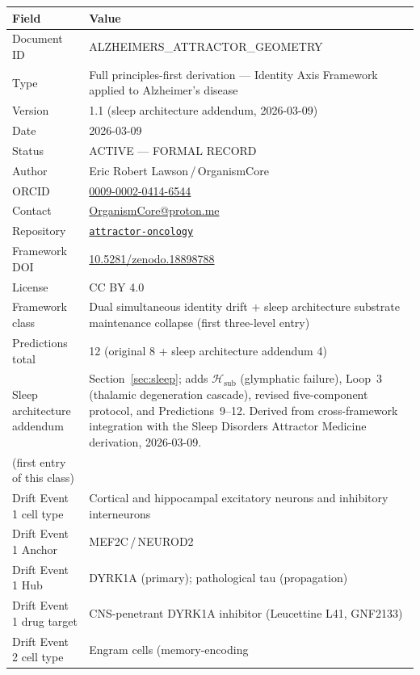 \documentclass[12pt,a4paper]{article}
\begin{document}
\begin{center}
\begin{tabular}{p{4.4cm}p{9.0cm}}
\toprule
\textbf{Field} & \textbf{Value} \\
\midrule
Document ID &
ALZHEIMERS\_ATTRACTOR\_GEOMETRY \\
Type &
Full principles-first derivation ---
Identity Axis Framework applied to
Alzheimer's disease \\
Version & 1.1 (sleep architecture addendum,
  2026-03-09) \\
Date & 2026-03-09 \\
Status & ACTIVE --- FORMAL RECORD \\
Author & Eric Robert Lawson\,/\,OrganismCore \\
ORCID &
\href{https://orcid.org/0009-0002-0414-6544}
{0009-0002-0414-6544} \\
Contact &
\href{mailto:OrganismCore@proton.me}
{OrganismCore@proton.me} \\
Repository &
\href{https://github.com/Eric-Robert-Lawson/attractor-oncology}
{\texttt{attractor-oncology}} \\
Framework DOI &
\href{https://doi.org/10.5281/zenodo.18898788}
{10.5281/zenodo.18898788} \\
License & CC BY 4.0 \\
\midrule
Framework class &
Dual simultaneous identity drift +
sleep architecture substrate maintenance
collapse (first three-level entry) \\
Predictions total & 12 (original 8 + sleep
  architecture addendum 4) \\
Sleep architecture addendum &
Section~\ref{sec:sleep}; adds
$\mathcal{H}_{\mathrm{sub}}$ (glymphatic failure),
Loop~3 (thalamic degeneration cascade), revised
five-component protocol, and Predictions~9--12.
Derived from cross-framework integration with the
Sleep Disorders Attractor Medicine derivation,
2026-03-09. \\
(first entry of this class) \\
Drift Event 1 cell type &
Cortical and hippocampal excitatory
neurons and inhibitory interneurons \\
Drift Event 1 Anchor &
MEF2C\,/\,NEUROD2 \\
Drift Event 1 Hub &
DYRK1A (primary);
pathological tau (propagation) \\
Drift Event 1 drug target &
CNS-penetrant DYRK1A inhibitor
(Leucettine L41, GNF2133) \\
Drift Event 2 cell type &
Engram cells (memory-encoding

\end{tabular}
\end{center}
\end{document}
